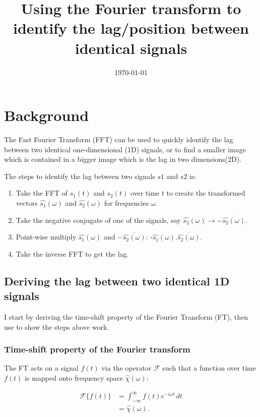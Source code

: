 \documentclass[%
 reprint,
 amsmath,amssymb,
 aps,
floatfix,
]{revtex4-2}
\begin{document}
\title{Using the Fourier transform to identify the lag/position between identical signals}%
\date{\today}

\maketitle

\section{Background}
The Fast Fourier Transform (FFT) can be used to quickly identify the lag between two identical one-dimensional (1D) signals, or to find a smaller image which is contained in a bigger image which is the lag in two dimensions(2D).

The steps to identify the lag between two signals $s1$ and $s2$ is:

\begin{enumerate}
    \item Take the FFT of $s_1(t)$ and $s_2(t)$ over time $t$ to create the transformed vectors $\hat{s_1}(\omega)$ and $\hat{s_2}(\omega)$ for frequencies $\omega$.
    \item Take the negative conjugate of one of the signals, say $\hat{s_2}(\omega)\rightarrow-\overline{\hat{s_2}(\omega)}$.
    \item Point-wise multiply $\hat{s_1}(\omega)$ and $-\overline{\hat{s_2}(\omega)}$: -$\hat{s_1}(\omega).\overline{\hat{s_2}(\omega)}$.
    \item Take the inverse FFT to get the lag.
\end{enumerate}

\subsection{Deriving the lag between two identical 1D signals}
I start by deriving the time-shift property of the Fourier Transform (FT), then use to show the steps above work.

\subsubsection{Time-shift property of the Fourier transform}
The FT acts on a signal $f(t)$ via the operator $\mathcal{F}$ such that a function over time $f(t)$ is mapped onto frequency space $\hat{\chi}(\omega)$:

\begin{align}
    \mathcal{F}\{f(t)\} &= \int^{\infty}_{-\infty} f(t)e^{-i\omega t}\,dt \\
    \label{eqn:FFT}
    &= \hat{\chi}(\omega).
\end{align}
\end{document}
